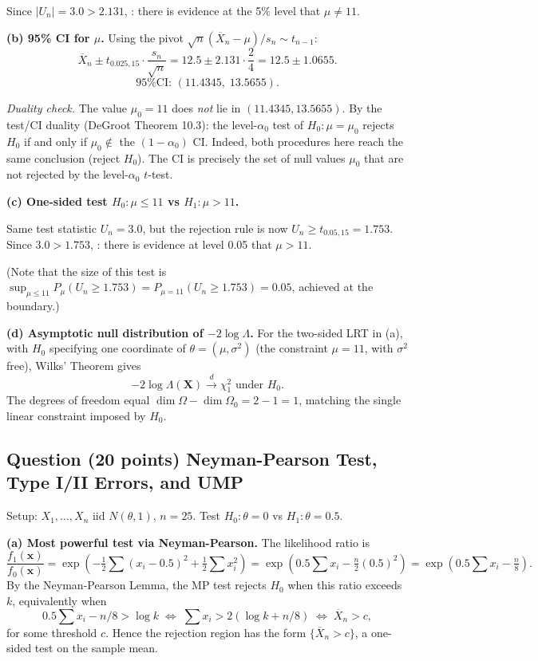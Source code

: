 \documentclass[11pt]{article}
\newcounter{qnum}
\newcommand{\question}[2]{\stepcounter{qnum}\subsection*{Question \theqnum \quad (#1 points) \hfill #2}}
\begin{document}
Since $|U_n| = 3.0 > 2.131$, : there is evidence at the 5\% level that $\mu \neq 11$.

\textbf{(b) 95\% CI for $\mu$.} Using the pivot $\sqrt{n}(\overline{X}_n - \mu)/s_n \sim t_{n-1}$:
\[ \overline{X}_n \pm t_{0.025,15} \cdot \frac{s_n}{\sqrt{n}} = 12.5 \pm 2.131 \cdot \frac{2}{4} = 12.5 \pm 1.0655. \]
\[ \boxed{\text{95\% CI: } (11.4345,\; 13.5655).} \]

\emph{Duality check.} The value $\mu_0 = 11$ does \emph{not} lie in $(11.4345, 13.5655)$. By the test/CI duality (DeGroot Theorem 10.3): the level-$\alpha_0$ test of $H_0: \mu = \mu_0$ rejects $H_0$ if and only if $\mu_0 \notin$ the $(1-\alpha_0)$ CI. Indeed, both procedures here reach the same conclusion (reject $H_0$). The CI is precisely the set of null values $\mu_0$ that are not rejected by the level-$\alpha_0$ $t$-test.

\textbf{(c) One-sided test $H_0: \mu \le 11$ vs $H_1: \mu > 11$.}

Same test statistic $U_n = 3.0$, but the rejection rule is now $U_n \ge t_{0.05,15} = 1.753$. Since $3.0 > 1.753$, : there is evidence at level 0.05 that $\mu > 11$.

(Note that the size of this test is $\sup_{\mu \le 11} P_\mu(U_n \ge 1.753) = P_{\mu=11}(U_n \ge 1.753) = 0.05$, achieved at the boundary.)

\textbf{(d) Asymptotic null distribution of $-2\log\Lambda$.} For the two-sided LRT in (a), with $H_0$ specifying one coordinate of $\theta = (\mu,\sigma^2)$ (the constraint $\mu = 11$, with $\sigma^2$ free), Wilks' Theorem gives
\[ \boxed{-2 \log \Lambda(\mathbf{X}) \xrightarrow{d} \chi^2_1 \text{ under } H_0.} \]
The degrees of freedom equal $\dim\Omega - \dim\Omega_0 = 2 - 1 = 1$, matching the single linear constraint imposed by $H_0$.

\question{20}{Neyman-Pearson Test, Type I/II Errors, and UMP}

Setup: $X_1,\ldots,X_n$ iid $N(\theta,1)$, $n = 25$. Test $H_0: \theta = 0$ vs $H_1: \theta = 0.5$.

\textbf{(a) Most powerful test via Neyman-Pearson.} The likelihood ratio is
\[ \frac{f_1(\mathbf{x})}{f_0(\mathbf{x})} = \exp\!\left(-\tfrac{1}{2}\sum (x_i - 0.5)^2 + \tfrac{1}{2}\sum x_i^2\right) = \exp\!\left(0.5\sum x_i - \tfrac{n}{2}(0.5)^2\right) = \exp\!\left(0.5\sum x_i - \tfrac{n}{8}\right). \]
By the Neyman-Pearson Lemma, the MP test rejects $H_0$ when this ratio exceeds $k$, equivalently when
\[ 0.5\sum x_i - n/8 > \log k \;\Longleftrightarrow\; \sum x_i > 2(\log k + n/8) \;\Longleftrightarrow\; \overline{X}_n > c, \]
for some threshold $c$. Hence the rejection region has the form $\boxed{\{\overline{X}_n > c\}}$, a one-sided test on the sample mean.
\end{document}
